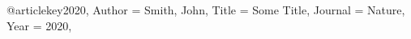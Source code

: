 @article{key2020,
  Author = {Smith, John},
  Title = {Some Title},
  Journal = {Nature},
  Year = {2020},
}
